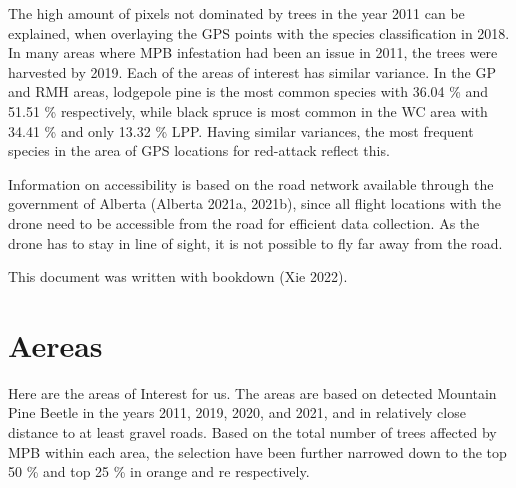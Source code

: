 \documentclass[
]{article}
\begin{document}
The high amount of pixels not dominated by trees in the year 2011 can be explained, when overlaying the GPS points with the species classification in 2018. In many areas where MPB infestation had been an issue in 2011, the trees were harvested by 2019. Each of the areas of interest has similar variance. In the GP and RMH areas, lodgepole pine is the most common species with 36.04 \% and 51.51 \% respectively, while black spruce is most common in the WC area with 34.41 \% and only 13.32 \% LPP. Having similar variances, the most frequent species in the area of GPS locations for red-attack reflect this.

Information on accessibility is based on the road network available through the government of Alberta (Alberta 2021a, 2021b), since all flight locations with the drone need to be accessible from the road for efficient data collection. As the drone has to stay in line of sight, it is not possible to fly far away from the road.

This document was written with bookdown (Xie 2022).

\hypertarget{aereas}{%
\section{Aereas}\label{aereas}}

Here are the areas of Interest for us. The areas are based on detected Mountain Pine Beetle in the years 2011, 2019, 2020, and 2021, and in relatively close distance to at least gravel roads. Based on the total number of trees affected by MPB within each area, the selection have been further narrowed down to the top 50 \% and top 25 \% in orange and re respectively.
\end{document}
